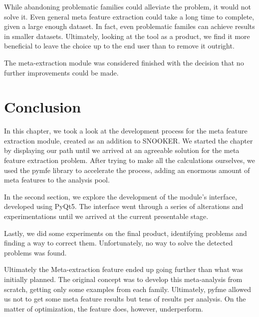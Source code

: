 While abandoning problematic families could alleviate the problem, it would not solve it. Even general meta feature extraction could take a long time to complete, given a large enough dataset. In fact, even problematic familes can achieve results in smaller datasets. Ultimately, looking at the tool as a product, we find it more beneficial to leave the choice up to the end user than to remove it outright.

The meta-extraction module was considered finished with the decision that no further improvements could be made.

\section{Conclusion}
In this chapter, we took a look at the development process for the meta feature extraction module, created as an addition to SNOOKER. We started the chapter by displaying our path until we arrived at an agreeable solution for the meta feature extraction problem. After trying to make all the calculations ourselves, we used the pymfe library to accelerate the process, adding an enormous amount of meta features to the analysis pool.

In the second section, we explore the development of the module's interface, developed using PyQt5. The interface went through a series of alterations and experimentations until we arrived at the current presentable stage.

Lastly, we did some experiments on the final product, identifying problems and finding a way to correct them. Unfortunately, no way to solve the detected problems was found.

Ultimately the Meta-extraction feature ended up going further than what was initially planned. The original concept was to develop this meta-analysis from scratch, getting only some examples from each family. Ultimately, pyfme allowed us not to get some meta feature results but tens of results per analysis. On the matter of optimization, the feature does, however, underperform.